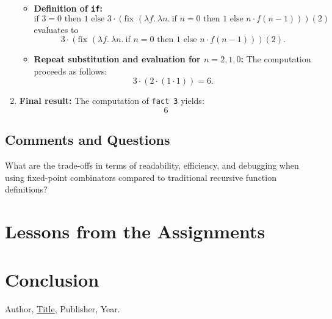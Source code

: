 \documentclass{article}
\theoremstyle{theorem}
\theoremstyle{definition}
\theoremstyle{remark}
\begin{document}
\begin{enumerate}
\begin{itemize}
        \item \textbf{Definition of \texttt{if}:}
        \[
        \text{if } 3 = 0 \text{ then } 1 \text{ else } 3 \cdot (\text{fix } (\lambda f.\ \lambda n.\ \text{if } n = 0 \text{ then } 1 \text{ else } n \cdot f (n-1)))(2)
        \]
        evaluates to
        \[
        3 \cdot (\text{fix } (\lambda f.\ \lambda n.\ \text{if } n = 0 \text{ then } 1 \text{ else } n \cdot f (n-1)))(2).
        \]

        \item \textbf{Repeat substitution and evaluation for \(n = 2, 1, 0\):}
        The computation proceeds as follows:
        \[
        3 \cdot (2 \cdot (1 \cdot 1)) = 6.
        \]
    \end{itemize}

    \item \textbf{Final result:} The computation of \texttt{fact 3} yields:
    \[
    \boxed{6}
    \]
\end{enumerate}


\subsection*{Comments and Questions}

What are the trade-offs in terms of readability, efficiency, and debugging when using fixed-point combinators compared to traditional recursive function definitions?

\section{Lessons from the Assignments}


\section{Conclusion}\label{conclusion}


\begin{thebibliography}{99}
 Author, \href{https://en.wikipedia.org/wiki/LaTeX}{Title}, Publisher, Year.
\end{thebibliography}
\end{document}

